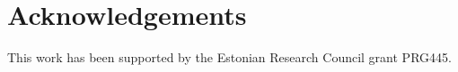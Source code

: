 \section*{Acknowledgements}

This work has been supported by the Estonian Research Council grant PRG445.
